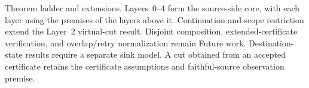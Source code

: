 
\caption{Theorem ladder and extensions. Layers~0--4 form the
source-side core, with each layer using the premises of the layers above
it. Continuation and scope restriction extend the Layer~2 virtual-cut
result. Disjoint composition, extended-certificate verification, and
overlap/retry normalization remain Future work. Destination-state
results require a separate sink model. A cut obtained from an accepted
certificate retains the certificate assumptions and faithful-source
observation premise.}
\label{fig:theorem-ladder}
